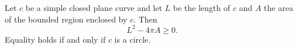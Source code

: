 Let $c$ be a simple closed plane curve and let $L$ be the length of $c$ and $A$ the area of the bounded region enclosed by $c$. Then
$$L^2 - 4\pi A \geq 0.$$
Equality holds if and only if $c$ is a circle.

